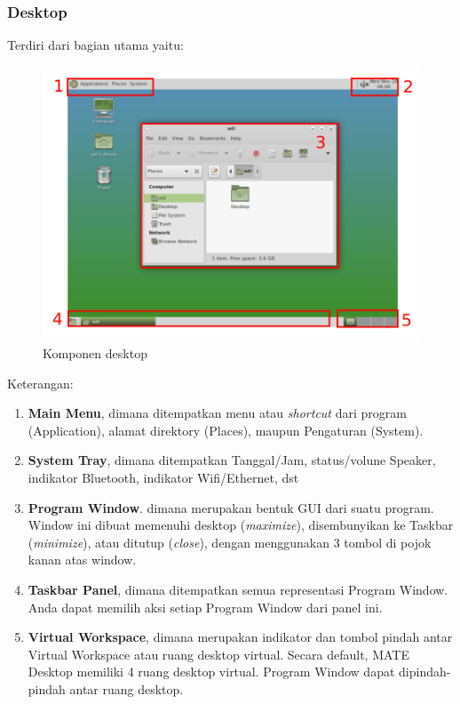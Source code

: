 \documentclass[12pt,]{article}
\begin{document}
	\subsubsection{Desktop}
	Terdiri dari bagian utama yaitu:
	\begin{figure}[H]
		\centering
		\includegraphics[width=0.8\linewidth]{images/vbox_de/matedesktop}
		\caption{Komponen desktop}
	\end{figure}
	Keterangan:
	\begin{enumerate}
		\item \textbf{Main Menu}, dimana ditempatkan menu atau \textit{shortcut} dari program (Application),
		alamat direktory (Places),
		maupun Pengaturan (System).

		\item \textbf{System Tray}, dimana ditempatkan Tanggal/Jam,
		status/volune Speaker,
		indikator Bluetooth,
		indikator Wifi/Ethernet,
		dst

		\item \textbf{Program Window}. dimana merupakan bentuk GUI dari suatu program.
		Window ini dibuat memenuhi desktop (\textit{maximize}),
		disembunyikan ke Taskbar (\textit{minimize}),
		atau ditutup (\textit{close}),
		dengan menggunakan 3 tombol di pojok kanan atas window.

		\item \textbf{Taskbar Panel}, dimana ditempatkan semua representasi Program Window.
		Anda dapat memilih aksi setiap Program Window dari panel ini.

		\item \textbf{Virtual Workspace}, dimana merupakan indikator dan tombol pindah antar Virtual Workspace atau ruang desktop virtual.
		Secara default, MATE Desktop memiliki 4 ruang desktop virtual.
		Program Window dapat dipindah-pindah antar ruang desktop.
	\end{enumerate}
\end{document}

